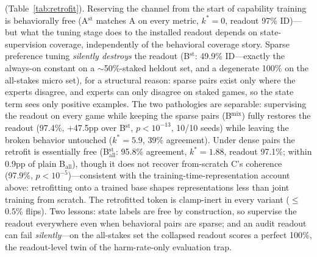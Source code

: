 \documentclass[manuscript, screen, review]{jair}
\begin{document}
(Table~\ref{tab:retrofit}). Reserving the channel from the start of capability training is behaviorally free (A$^{\mathrm{st}}$ matches A on every metric, $k^*{=}0$, readout 97\% ID)---but what the tuning stage does to the installed readout depends on state-supervision coverage, independently of the behavioral coverage story. Sparse preference tuning \emph{silently destroys} the readout (B$^{\mathrm{st}}$: 49.9\% ID---exactly the always-on constant on a ${\sim}$50\%-staked heldout set, and a degenerate 100\% on the all-stakes micro set), for a structural reason: sparse pairs exist only where the experts disagree, and experts can only disagree on staked games, so the state term sees only positive examples. The two pathologies are separable: supervising the readout on every game while keeping the sparse pairs (B$^{\mathrm{mix}}$) fully restores the readout (97.4\%, $+$47.5pp over B$^{\mathrm{st}}$, $p{<}10^{-13}$, 10/10 seeds) while leaving the broken behavior untouched ($k^*{=}5.9$, 39\% agreement). Under dense pairs the retrofit is essentially free (B$_{\mathrm{all}}^{\mathrm{st}}$: 95.8\% agreement, $k^*{=}1.88$, readout 97.1\%; within 0.9pp of plain B$_{\mathrm{all}}$), though it does not recover from-scratch C's coherence (97.9\%, $p{<}10^{-5}$)---consistent with the training-time-representation account above: retrofitting onto a trained base shapes representations less than joint training from scratch. The retrofitted token is clamp-inert in every variant ($\leq$0.5\% flips). Two lessons: state labels are free by construction, so supervise the readout everywhere even when behavioral pairs are sparse; and an audit readout can fail \emph{silently}---on the all-stakes set the collapsed readout scores a perfect 100\%, the readout-level twin of the harm-rate-only evaluation trap.
\end{document}
